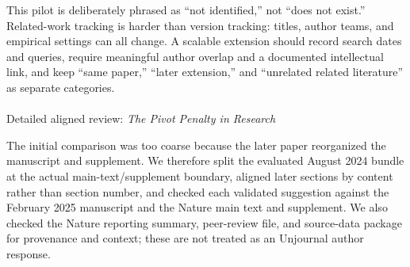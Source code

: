 \documentclass[
  11pt,
  letterpaper,
]{article}
\makeatletter
\let\oldparagraph\paragraph
\renewcommand{\paragraph}{
    \@ifstar
      \xxxParagraphStar
      \xxxParagraphNoStar
  }
\newcommand{\xxxParagraphStar}[1]{\oldparagraph*{#1}\mbox{}}
\newcommand{\xxxParagraphNoStar}[1]{\oldparagraph{#1}\mbox{}}
\makeatother
\begin{document}
This pilot is deliberately phrased as ``not identified,'' not ``does not
exist.'' Related-work tracking is harder than version tracking: titles,
author teams, and empirical settings can all change. A scalable
extension should record search dates and queries, require meaningful
author overlap and a documented intellectual link, and keep ``same
paper,'' ``later extension,'' and ``unrelated related literature'' as
separate categories.

\paragraph{\texorpdfstring{Detailed aligned review: \emph{The Pivot
Penalty in
Research}}{Detailed aligned review: The Pivot Penalty in Research}}\label{detailed-aligned-review-the-pivot-penalty-in-research}

The initial comparison was too coarse because the later paper
reorganized the manuscript and supplement. We therefore split the
evaluated August 2024 bundle at the actual main-text/supplement
boundary, aligned later sections by content rather than section number,
and checked each validated suggestion against the February 2025
manuscript and the Nature main text and supplement. We also checked the
Nature reporting summary, peer-review file, and source-data package for
provenance and context; these are not treated as an Unjournal author
response.
\end{document}
